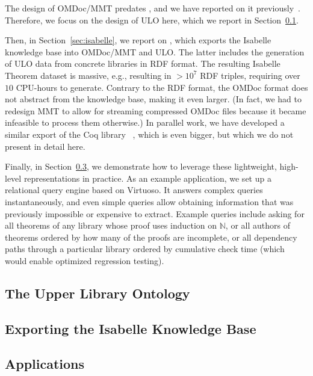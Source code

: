 The design of OMDoc/MMT predates \pn, and we have reported on it previously~\cite{Kohlhase:OMDoc1.2,RabKoh:WSMSML13,DehKohKon:iop16,KohMuePfe:kbimss17}.
Therefore, we focus on the design of ULO here, which we report in Section~\ref{sec:ulo}.

Then, in Section~\ref{sec:isabelle}, we report on , which exports the Isabelle knowledge base into OMDoc/MMT and ULO.  The latter includes the generation of ULO data from concrete libraries in RDF format.  The resulting Isabelle Theorem dataset is massive, e.g., resulting in $>10^7$ RDF triples, requiring over $10$ CPU-hours to generate.
Contrary to the RDF format, the OMDoc format does not abstract from the knowledge base, making it even larger. (In fact, we had to redesign MMT to allow for streaming compressed OMDoc files because it became infeasible to process them otherwise.)
In parallel work, we have developed a similar export of the Coq library ~\cite{MueRabSac:cltg19}, which is even bigger, but which we do not present in detail here.

Finally, in Section~\ref{sec:uloappl}, we demonstrate how to leverage these lightweight, high-level representations in practice.
As an example application, we set up a relational query engine based on Virtuoso.
It answers complex queries instantaneously, and even simple queries allow obtaining information that was previously impossible or expensive to extract.
Example queries include asking for all theorems of any library whose proof uses induction on $\mathbb{N}$,
or all authors of theorems ordered by how many of the proofs are incomplete,
or all dependency paths through a particular library ordered by cumulative check time (which would enable optimized regression testing).

\subsection{The Upper Library Ontology}\label{sec:ulo}


\subsection{Exporting the Isabelle Knowledge Base}\label{sec:isabelle-export}


\subsection{Applications}\label{sec:uloappl}



